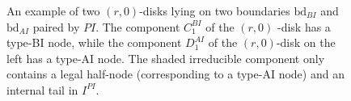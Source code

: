 \documentclass[11pt]{amsart}
\theoremstyle{definition}
\theoremstyle{remark}
\newcommand{\<}{\left<}
\renewcommand{\>}{\right>}
\numberwithin{equation}{section}
\begin{document}
\begin{figure}[h]
\begin{subfigure}{.45\textwidth}
\end{subfigure}

        \caption{An example of two $(r,0)$-disks lying on two boundaries $\text{bd}_{BI}$ and $\text{bd}_{AI}$ paired by $PI$. The component $C_1^{BI}$ of the $(r,0)$%
-disk  has %
a type-BI node, while the component $D_1^{AI}$ of the $(r,0)$-disk on the left has a type-AI node. The shaded irreducible component only contains a legal half-node (corresponding to a type-AI node) and an internal tail in $I^{PI}$. }
        \label{fig rh surface}
    \end{figure}
\end{document}

